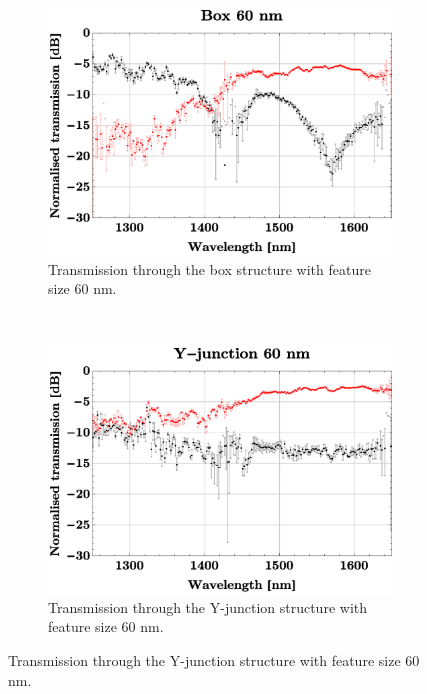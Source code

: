 \begin{figure}[H]
    \vspace{5 mm}
    
    
    \begin{subfigure}[h]{0.50\textwidth}
        \centering
        \includegraphics[width=1.0\textwidth]
        {fig/Kilde2Multimeter/box60multimeterconcatenated.eps}
        \caption{Transmission through the box structure with feature size 60 nm.}
    \end{subfigure}%
    ~ 
    \begin{subfigure}[h]{0.50\textwidth}
        \centering
        \includegraphics[width=1.0\textwidth]
        {fig/Kilde2Multimeter/yjunc60multimeterconcatenated.eps}
        \caption{Transmission through the Y-junction structure with feature size 60 nm.}
    \end{subfigure}
    

\end{figure}
